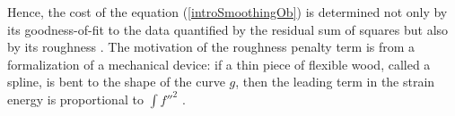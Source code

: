 Hence, the cost of the equation (\ref{introSmoothingOb}) is determined not only by its goodness-of-fit to the data quantified by the residual sum of squares but also by its roughness \cite{schwarz2012geodesy}. The motivation of the roughness penalty term is from a formalization of a mechanical device: if a thin piece of flexible wood, called a spline, is bent to the shape of the curve $g$, then the leading term in the strain energy is proportional to $\int f''^2$ \cite{green1993nonparametric}. 


%
%
%
%
%



